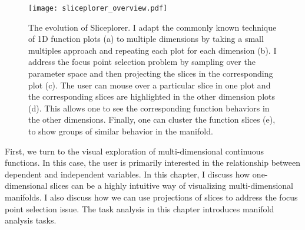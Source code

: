 
\begin{figure}
  \centering
  \texttt{[image: sliceplorer\_overview.pdf]}
  \caption[The evolution of Sliceplorer.]{%
    The evolution of Sliceplorer. I adapt the commonly known technique of
    1D function plots (a) to
    multiple dimensions by taking a small multiples approach and repeating each
    plot for each dimension (b). I address the
    focus point selection problem by sampling over the parameter space and then
    projecting the slices in the corresponding plot
    (c). The user can mouse over a particular
    slice in one plot and the corresponding slices are highlighted in the other
    dimension plots (d). This allows one to
    see the corresponding function behaviors in the other dimensions.  Finally,
    one can cluster the function slices (e), to
    show groups of similar behavior in the manifold.
  }
  \label{fig:walkthrough}
\end{figure}

First, we turn to the visual exploration of multi-dimensional continuous
functions. In this case, the user is primarily interested in the relationship
between dependent and independent variables. In this chapter, I discuss how
one-dimensional slices can be a highly intuitive way of visualizing
multi-dimensional manifolds. I also discuss how we can use projections of 
slices to address the focus point selection issue. The task analysis in this
chapter introduces manifold analysis tasks.











